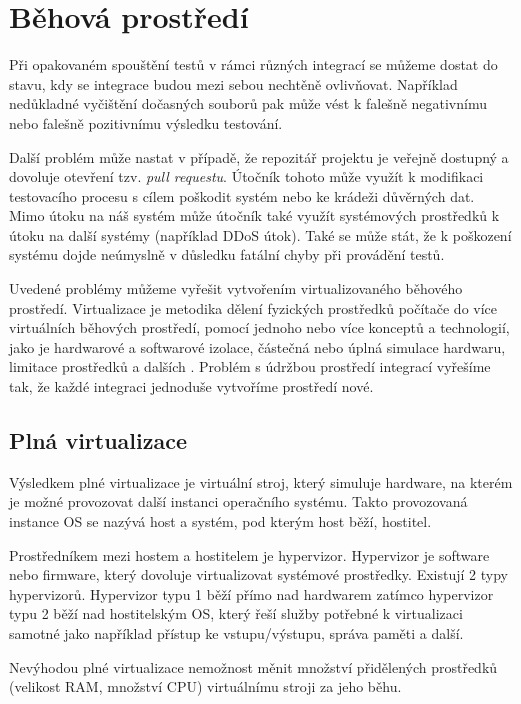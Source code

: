 \section{Běhová prostředí}

Při opakovaném spouštění testů v rámci různých integrací se můžeme dostat do stavu, kdy se integrace budou mezi sebou nechtěně ovlivňovat.
Například nedůkladné vyčištění dočasných souborů pak může vést k falešně negativnímu nebo falešně pozitivnímu výsledku testování.

Další problém může nastat v případě, že repozitář projektu je veřejně dostupný a dovoluje otevření tzv. \textit{pull requestu}.
Útočník tohoto může využít k modifikaci testovacího procesu s cílem poškodit systém nebo ke krádeži důvěrných dat.
Mimo útoku na náš systém může útočník také využít systémových prostředků k útoku na další systémy (například DDoS útok).
Také se může stát, že k poškození systému dojde neúmyslně v důsledku fatální chyby při provádění testů.

Uvedené problémy můžeme vyřešit vytvořením virtualizovaného běhového prostředí.
Virtualizace je metodika dělení fyzických prostředků počítače do více virtuálních běhových prostředí, pomocí jednoho nebo více konceptů a technologií, jako je hardwarové a softwarové izolace, částečná nebo úplná simulace hardwaru, limitace prostředků a dalších \cite{virt_intro}.
Problém s údržbou prostředí integrací vyřešíme tak, že každé integraci jednoduše vytvoříme prostředí nové.

\subsection{Plná virtualizace}

Výsledkem plné virtualizace je virtuální stroj, který simuluje hardware, na kterém je možné provozovat další instanci operačního systému.
Takto provozovaná instance OS se nazývá host a systém, pod kterým host běží, hostitel.

Prostředníkem mezi hostem a hostitelem je hypervizor.
Hypervizor je software nebo firmware, který dovoluje virtualizovat systémové prostředky.
Existují 2 typy hypervizorů.
Hypervizor typu 1 běží přímo nad hardwarem zatímco hypervizor typu 2 běží nad hostitelským OS, který řeší služby potřebné k virtualizaci samotné jako například přístup ke vstupu/výstupu, správa paměti a další.
\cite{hypervisor_def}

Nevýhodou plné virtualizace nemožnost měnit množství přidělených prostředků (velikost RAM, množství CPU) virtuálnímu stroji za jeho běhu.

